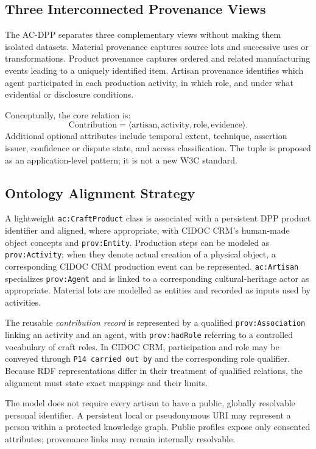 \documentclass[conference]{IEEEtran}
\begin{document}
\subsection{Three Interconnected Provenance Views}
The AC-DPP separates three complementary views without making them isolated datasets. Material provenance captures source lots and successive uses or transformations. Product provenance captures ordered and related manufacturing events leading to a uniquely identified item. Artisan provenance identifies which agent participated in each production activity, in which role, and under what evidential or disclosure conditions.

Conceptually, the core relation is:
\begin{equation}
\text{Contribution}=\langle \text{artisan},\text{activity},\text{role},\text{evidence}\rangle.
\label{eq:contribution}
\end{equation}
Additional optional attributes include temporal extent, technique, assertion issuer, confidence or dispute state, and access classification. The tuple is proposed as an application-level pattern; it is not a new W3C standard.

\subsection{Ontology Alignment Strategy}
A lightweight \texttt{ac:CraftProduct} class is associated with a persistent DPP product identifier and aligned, where appropriate, with CIDOC CRM's human-made object concepts and \texttt{prov:Entity}. Production steps can be modeled as \texttt{prov:Activity}; when they denote actual creation of a physical object, a corresponding CIDOC CRM production event can be represented. \texttt{ac:Artisan} specializes \texttt{prov:Agent} and is linked to a corresponding cultural-heritage actor as appropriate. Material lots are modelled as entities and recorded as inputs used by activities.

The reusable \emph{contribution record} is represented by a qualified \texttt{prov:Association} linking an activity and an agent, with \texttt{prov:hadRole} referring to a controlled vocabulary of craft roles. In CIDOC CRM, participation and role may be conveyed through \texttt{P14 carried out by} and the corresponding role qualifier. Because RDF representations differ in their treatment of qualified relations, the alignment must state exact mappings and their limits.

The model does not require every artisan to have a public, globally resolvable personal identifier. A persistent local or pseudonymous URI may represent a person within a protected knowledge graph. Public profiles expose only consented attributes; provenance links may remain internally resolvable.
\end{document}
